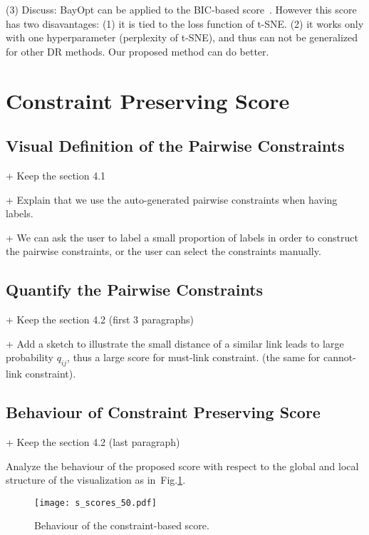 \vspace{8pt} \par
(3) Discuss: BayOpt can be applied to the BIC-based score~\cite{cao2017automatic}.
However this score has two disavantages:
(1) it is tied to the loss function of t-SNE.
(2) it works only with one hyperparameter (perplexity of t-SNE), and thus can not be generalized for other DR methods.
Our proposed method can do better.



\section{Constraint Preserving Score}

\subsection{Visual Definition of the Pairwise Constraints}
+ Keep the section 4.1

+ Explain that  we use the auto-generated pairwise constraints when having labels.

+ We can ask the user to label a small proportion of labels in order to construct the pairwise constraints, or the user can select the constraints manually.

\subsection{Quantify the Pairwise Constraints}
+ Keep the section 4.2 (first 3 paragraphs)

+ Add a sketch to illustrate the small distance of a similar link leads to large probability $q_{ij}$, thus a large score for must-link constraint. (the same for cannot-link constraint).

\subsection{Behaviour of Constraint Preserving Score}

+ Keep the section 4.2 (last paragraph)

Analyze the behaviour of the proposed score with respect to the global and local structure of the visualization as in~Fig.\ref{fig:score}.

\begin{figure}
\centering
\texttt{[image: s\_scores\_50.pdf]}
\caption{Behaviour of the constraint-based score.}\label{fig:score}
\end{figure}



